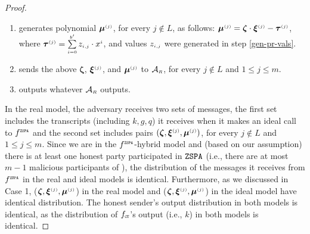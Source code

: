 \begin{proof}
\begin{enumerate}
%
 \item generates polynomial ${\bm\mu}^{\scriptscriptstyle (j)}$, for every $j \notin L$, as follows:
   ${\bm\mu}^{\scriptscriptstyle (j)} = {\bm\zeta}\cdot {\bm\xi}^{\scriptscriptstyle (j)}-\bm\tau^{\scriptscriptstyle (j)}$, where ${\bm\tau}^{\scriptscriptstyle (j)}=\sum\limits^{\scriptscriptstyle b'}_{\scriptscriptstyle i=0}z_{\scriptscriptstyle i,j}\cdot x^{\scriptscriptstyle i}$, and values $z_{\scriptscriptstyle i,j}$ were generated in step \ref{gen-pr-vals}.
%
\item sends the above ${\bm \zeta}$,  ${\bm\xi}^{\scriptscriptstyle (j)}$, and ${\bm\mu}^{\scriptscriptstyle (j)}$ to $\mathcal{A}_{\scriptscriptstyle R}$, for every $j\notin L$ and $1\leq j \leq m$. 
%
\item\label{adversary-outputs--} outputs whatever  $\mathcal{A}_{\scriptscriptstyle R}$ outputs. 
%
 \end{enumerate}
%
 \vspace{-2mm}
 
In the real model, the adversary receives two sets of messages, the first set includes the transcripts (including $ k,  g,  q$) it receives when it makes an ideal call to $f^{\scriptscriptstyle \mathtt{ZSPA}}$ and the second set includes pairs $({\bm \zeta},  {\bm\xi}^{\scriptscriptstyle (j)}, {\bm\mu}^{\scriptscriptstyle (j)})$, for every $j\notin  L$ and $1\leq j \leq m$. Since we are in the  $f^{\scriptscriptstyle \mathtt{ZSPA}}$-hybrid model and (based on our assumption) there is at least one honest party participated in  $\mathtt{ZSPA}$ (i.e., there are at most $m-1$ malicious participants of \zspa), the distribution of the messages it receives from $f^{\scriptscriptstyle \mathtt{ZSPA}}$ in the real and ideal models is identical. Furthermore, as we discussed in Case 1, (${\bm \zeta}, {\bm\xi}^{\scriptscriptstyle (j)}, {\bm\mu}^{\scriptscriptstyle (j)}$) in the real model and ($ {\bm \zeta}, {\bm\xi}^{\scriptscriptstyle (j)}, {\bm\mu}^{\scriptscriptstyle (j)}$) in the ideal model have identical distribution. The honest sender's output distribution in both models is identical, as the distribution of $f_{\scriptscriptstyle \mathtt{CT}}$'s output (i.e., $ k$) in both models is identical.




\end{proof}
